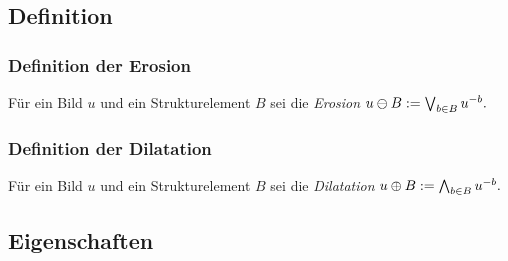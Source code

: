 \documentclass{beamer}
\begin{document}
\subsection{Definition}

\begin{frame}
    \frametitle{Definition der Erosion}
    \begin{definition}
        Für ein Bild $u$ und ein Strukturelement $B$ sei die \emph{Erosion}
        \begin{math}
            u \ominus B := \bigvee_{b \in B} u^{-b}.
        \end{math}
    \end{definition}
\end{frame}

\begin{frame}
    \frametitle{Definition der Dilatation}
    \begin{definition}
        Für ein Bild $u$ und ein Strukturelement $B$ sei die \emph{Dilatation}
        \begin{math}
            u \oplus B := \bigwedge_{b \in B} u^{-b}.
        \end{math}
    \end{definition}
\end{frame}

\subsection{Eigenschaften}
\end{document}

